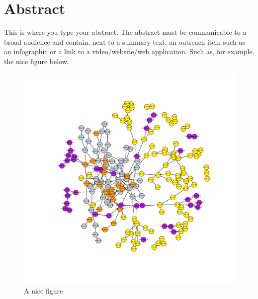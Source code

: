 \documentclass{amsart}
\theoremstyle{plain}
\newcommand{\mainmatter}{
    \newpage
    \pagenumbering{arabic}  %
}
\begin{document}
\section*{Abstract}
This is where you type your abstract.
The abstract must be communicable to a broad audience and contain, next to a summary text, an outreach item such as an infographic or a link to a video/website/web application.
Such as, for example, the nice figure below.
\begin{figure}[h!]
\centering
  \includegraphics[width=\textwidth]{figures/NTWK.pdf}
    \caption{A nice figure}
  \label{FIG:NTWK2}
\end{figure}



\newpage
\tableofcontents






\cleardoublepage
\mainmatter
\end{document}
